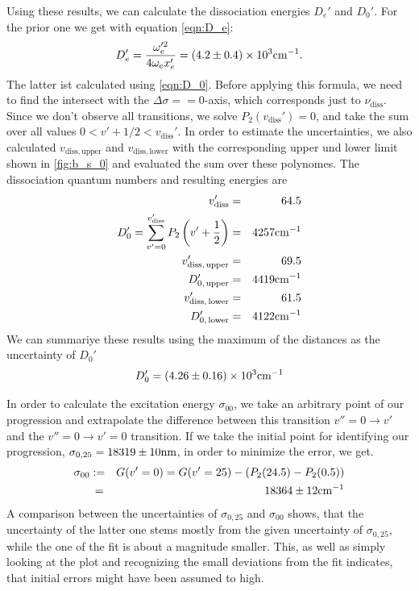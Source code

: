 Using these results, we can calculate the dissociation energies $D_e'$ and $D_0'$. For the 
prior one we get with equation \eqref{eqn:D_e}:
\begin{equation}
    D_e' = \frac{ \omega_e'^2}{ 4  \omega_e x_e'} =\left(4.2 \pm 0.4\right) \times 10^{3} \mathrm{cm^{-1}}.
\end{equation}
The latter ist calculated using \ref{eqn:D_0}. Before applying this formula, we need to find 
the intersect with the $\Delta \sigma == 0$-axis, which corresponds just to 
$\nu_\mathrm{diss}$. Since we don't observe all transitions, we solve $P_2(v_\mathrm{diss}') = 0$, and 
take the sum over all values $0 < v' + 1/2 < v_\mathrm{diss}'$. In order to estimate the 
uncertainties, we also calculated $v_\mathrm{diss, upper}$ and  $v_\mathrm{diss, lower}$ with 
the corresponding upper und lower limit shown in \ref{fig:b_s_0} and evaluated the sum over 
these polynomes. The dissociation quantum numbers and resulting energies are 
\begin{eqnarray}
    v_\mathrm{diss}' &=& 64.5 \\
    D_0' = \sum_{v' = 0 }^{v'_\mathrm{diss}} P_2 \left (v' + \frac{1}{2} \right ) &=& 4257 \mathrm{cm^{-1}} \\
    v_\mathrm{diss,\, upper}' &=& 69.5 \\
    D_{0,\, \mathrm{upper}}' &=& 4419 \mathrm{cm^{-1}}\\
    v_\mathrm{diss,\, lower}' &=& 61.5 \\
    D_{0,\, \mathrm{lower}}' &=& 4122 \mathrm{cm^{-1}}
\end{eqnarray}
We can summariye these results using the maximum of the distances as the uncertainty of $D_0'$
\begin{equation}
    D_0' = \left(4.26 \pm 0.16\right) \times 10^{3} \mathrm{cm^{-1}}
\end{equation}

In order to calculate the excitation energy $\sigma_{00}$, we take an arbitrary point of our 
progression and extrapolate the difference between this transition 
$v''= 0 \rightarrow v'$ and the $v'' = 0 \rightarrow v' = 0$ transition. If we take the initial 
point for identifying our progression, $\sigma_{0, 25} = 18319 \pm 10\mathrm{nm}$, in order 
to minimize the error, we get.
\begin{eqnarray}
    \sigma_{00} &:=& G(v' = 0) = G(v' = 25) - (P_2(24.5) - P_2(0.5)) \nonumber \\
                 &\, =& 18364 \pm 12 \mathrm{cm^{-1}}
\end{eqnarray}
A comparison between the uncertainties of $\sigma_{0, 25}$ and $\sigma_{00}$ shows, 
that the uncertainty of the latter one stems mostly from the given uncertainty 
of $\sigma_{0, 25}$, while the one of the fit is about a magnitude smaller. This, 
as well as simply looking at the plot and recognizing the small deviations from 
the fit indicates, that initial errors might have been assumed to high. 

